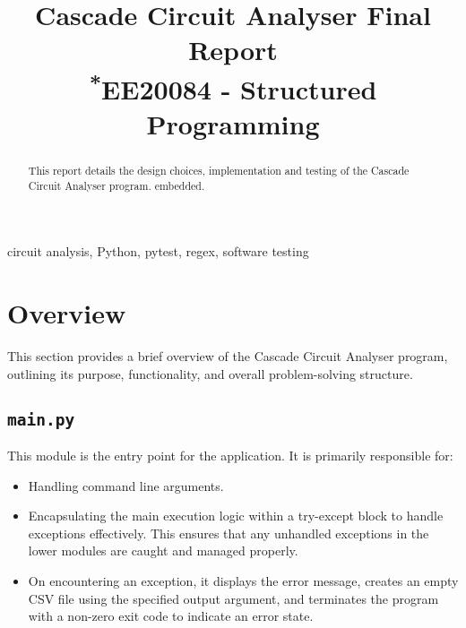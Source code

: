 \documentclass[conference]{IEEEtran}
\begin{document}
\title{Cascade Circuit Analyser Final Report\\
{\footnotesize \textsuperscript{*}EE20084 - Structured Programming}
}

\author{
}
\maketitle

\begin{abstract}
    This report details the design choices, implementation and testing of the Cascade Circuit Analyser program.
    embedded.
\end{abstract}

\begin{IEEEkeywords}
    circuit analysis, Python, pytest, regex, software testing
\end{IEEEkeywords}

\tableofcontents

\section{Overview}
This section provides a brief overview of the Cascade Circuit Analyser program, outlining its purpose, functionality, and overall problem-solving structure.
\subsection{\textbf{\texttt{main.py}}}
This module is the entry point for the application. It is primarily responsible for:
\begin{itemize}
  \item Handling command line arguments.
  \item Encapsulating the main execution logic within a try-except block to handle exceptions effectively. This ensures that any unhandled exceptions in the lower modules are caught and managed properly.
  \item On encountering an exception, it displays the error message, creates an empty CSV file using the specified output argument, and terminates the program with a non-zero exit code to indicate an error state.
\end{itemize}
\end{document}
